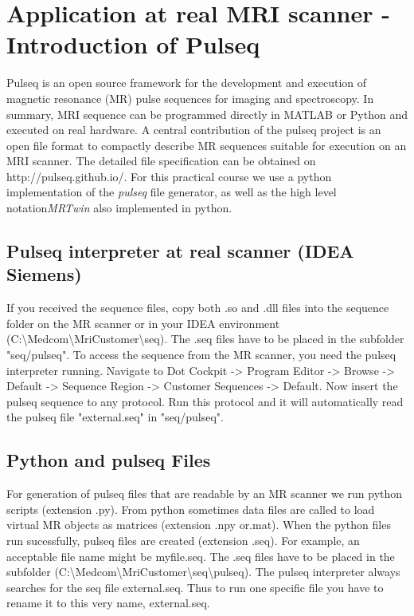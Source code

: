\documentclass[a4paper,12pt]{extarticle}
\begin{document}
\newpage

\section{Application at real MRI scanner - Introduction of Pulseq}
\vspace{7.5cm}
	Pulseq is an open source framework for the development and execution of magnetic resonance (MR) pulse sequences for imaging and spectroscopy. In summary, MRI sequence can be programmed directly in MATLAB or Python and executed on real hardware.
    A central contribution of the pulseq project is an open file format to compactly describe MR sequences suitable for execution on an MRI scanner. The detailed file specification can be obtained on http://pulseq.github.io/.
    For this practical course we use a  python implementation of the \emph{pulseq} file generator, as well as the  high level notation\emph{MRTwin} also implemented in python.  

\subsection{Pulseq interpreter at real scanner (IDEA Siemens)}
            If you received the sequence files, copy both .so and .dll files into the sequence folder on the MR scanner or in your IDEA environment (C:\textbackslash Medcom\textbackslash MriCustomer\textbackslash seq). The .seq files have to be placed in the subfolder "seq/pulseq".
            To access the sequence from the MR scanner, you need the pulseq interpreter running. Navigate to Dot Cockpit -> Program Editor -> Browse -> Default -> Sequence Region -> Customer Sequences -> Default. Now insert the pulseq sequence to any protocol. Run this protocol and it will automatically read the pulseq file "external.seq" in "seq/pulseq".
            
\subsection{Python and pulseq Files}
			For generation of pulseq files that are readable by an MR scanner we run python scripts (extension .py). From python sometimes data files are called to load virtual MR objects as matrices (extension .npy or.mat). When the python files run sucessfully, pulseq files are created (extension .seq). For example, an acceptable file name might be myfile.seq. 
            The .seq files have to be placed in the subfolder (C:\textbackslash Medcom\textbackslash MriCustomer\textbackslash seq\textbackslash pulseq). The pulseq interpreter always searches for the seq file external.seq. Thus to run one specific file you have to rename it to this very name, external.seq.
 
\end{document}
